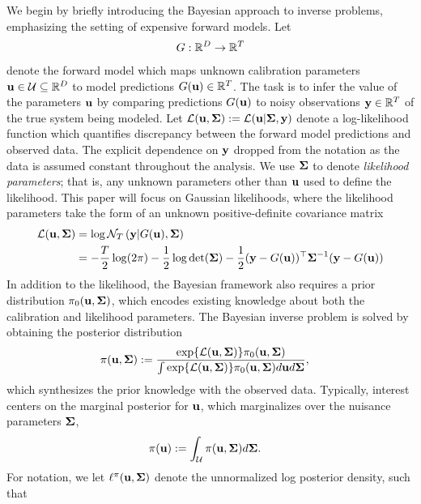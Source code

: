 \documentclass[12pt]{article}
\begin{document}
We begin by briefly introducing the Bayesian approach to inverse problems, emphasizing the setting of expensive forward models. 
Let 
\begin{align*}
G: \mathbb{R}^{D} \to \mathbb{R}^{T}
\end{align*}
denote the forward model which maps unknown calibration parameters $\mathbf{u} \in \mathcal{U} \subseteq \mathbb{R}^{D}$ to model predictions 
$G(\mathbf{u}) \in \mathbb{R}^{T}$. The task is to infer the value of the parameters $\mathbf{u}$ by comparing predictions $G(\mathbf{u})$ to noisy 
observations $\mathbf{y} \in \mathbb{R}^{T}$ of the true system being modeled. Let $\mathcal{L}(\mathbf{u}, \boldsymbol{\Sigma}) := \mathcal{L}(\mathbf{u} |\boldsymbol{\Sigma}, \mathbf{y})$ denote 
a log-likelihood function which quantifies discrepancy between the forward model predictions and observed data. The 
explicit dependence on $\mathbf{y}$ dropped from the notation as the data is assumed constant throughout the analysis. We use $\boldsymbol{\Sigma}$ to denote 
\textit{likelihood parameters}; that is, any unknown parameters other than $\mathbf{u}$ used to define the likelihood. This paper will focus on Gaussian likelihoods, 
where the likelihood parameters take the form of an unknown positive-definite covariance matrix 
\begin{align}
\mathcal{L}(\mathbf{u}, \boldsymbol{\Sigma}) &= \log \mathcal{N}_{T}\left(\mathbf{y} | G(\mathbf{u}), \boldsymbol{\Sigma} \right) \nonumber \\
			       &= -\frac{T}{2} \log(2\pi) - \frac{1}{2} \log \det(\boldsymbol{\Sigma}) - \frac{1}{2} (\mathbf{y} - G(\mathbf{u}))^\top \boldsymbol{\Sigma}^{-1} (\mathbf{y} - G(\mathbf{u})) \label{llik}
\end{align}
In addition to the likelihood, the Bayesian framework also requires a prior distribution $\pi_0(\mathbf{u}, \boldsymbol{\Sigma})$, 
which encodes existing knowledge about both the calibration and likelihood parameters. 
The Bayesian inverse problem is solved by obtaining the 
posterior distribution
\begin{align*}
\pi(\mathbf{u}, \boldsymbol{\Sigma}) &:= \frac{\exp\mathopen{}\left\{\mathcal{L}(\mathbf{u}, \boldsymbol{\Sigma})\right\}\mathclose{}\pi_0(\mathbf{u}, \boldsymbol{\Sigma})}{\int \exp\mathopen{}\left\{\mathcal{L}(\mathbf{u}, \boldsymbol{\Sigma})\right\}\mathclose{}\pi_0(\mathbf{u}, \boldsymbol{\Sigma}) d\mathbf{u} d\boldsymbol{\Sigma}},
\end{align*}
which synthesizes the prior knowledge with the observed data. Typically, interest centers on the marginal posterior for $\mathbf{u}$, which marginalizes over the nuisance 
parameters $\boldsymbol{\Sigma}$,
\begin{align*}
\pi(\mathbf{u}) &:= \int_{\mathcal{U}} \pi(\mathbf{u}, \boldsymbol{\Sigma}) d\boldsymbol{\Sigma}.
\end{align*}
For notation, we let $\ell^{\pi}(\mathbf{u}, \boldsymbol{\Sigma})$ denote the unnormalized log posterior density, such that 
\end{document}
